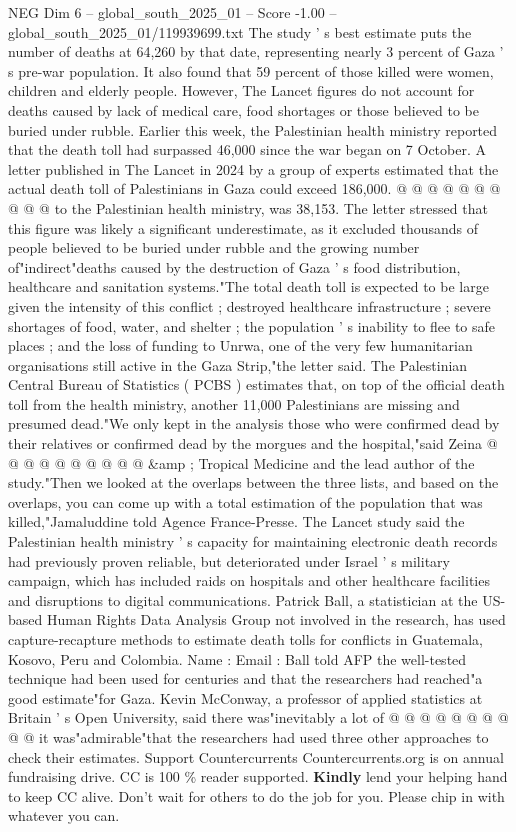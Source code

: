 \begin{textsample}{NEG Dim 6 – global\_south\_2025\_01 – Score -1.00 – global\_south\_2025\_01/119939699.txt}
The study ' s best estimate puts the number of deaths at 64,260 by that date, representing nearly 3 percent of Gaza ' s pre-war population.
It also found that 59 percent of those killed were women, children and elderly people.
However, The Lancet figures do not account for deaths caused by lack of medical care, food shortages or those believed to be buried under rubble.
Earlier this week, the Palestinian health ministry reported that the death toll had surpassed 46,000 since the war began on 7 October.
A letter published in The Lancet in 2024 by a group of experts estimated that the actual death toll of Palestinians in Gaza could exceed 186,000. @ @ @ @ @ @ @ @ @ @ to the Palestinian health ministry, was 38,153.
The letter stressed that this figure was likely a significant underestimate, as it excluded thousands of people believed to be buried under rubble and the growing number of"indirect"deaths caused by the destruction of Gaza ' s food distribution, healthcare and sanitation systems."The total death toll is expected to be large given the intensity of this conflict ; destroyed healthcare infrastructure ; severe shortages of food, water, and shelter ; the population ' s inability to flee to safe places ; and the loss of funding to Unrwa, one of the very few humanitarian organisations still active in the Gaza Strip,"the letter said.
The Palestinian Central Bureau of Statistics ( PCBS ) estimates that, on top of the official death toll from the health ministry, another 11,000 Palestinians are missing and presumed dead."We only kept in the analysis those who were confirmed dead by their relatives or confirmed dead by the morgues and the hospital,"said Zeina @ @ @ @ @ @ @ @ @ @ \&amp ; Tropical Medicine and the lead author of the study."Then we looked at the overlaps between the three lists, and based on the overlaps, you can come up with a total estimation of the population that was killed,"Jamaluddine told Agence France-Presse.
The Lancet study said the Palestinian health ministry ' s capacity for maintaining electronic death records had previously proven reliable, but deteriorated under Israel ' s military campaign, which has included raids on hospitals and other healthcare facilities and disruptions to digital communications.
Patrick Ball, a statistician at the US-based Human Rights Data Analysis Group not involved in the research, has used capture-recapture methods to estimate death tolls for conflicts in Guatemala, Kosovo, Peru and Colombia.
Name : Email : Ball told AFP the well-tested technique had been used for centuries and that the researchers had reached"a good estimate"for Gaza.
Kevin McConway, a professor of applied statistics at Britain ' s Open University, said there was"inevitably a lot of @ @ @ @ @ @ @ @ @ @ it was"admirable"that the researchers had used three other approaches to check their estimates.
Support Countercurrents Countercurrents.org is on annual fundraising drive.
CC is 100 \% reader supported. \textbf{Kindly} lend your helping hand to keep CC alive.
Don't wait for others to do the job for you.
Please chip in with whatever you can.

\end{textsample}
